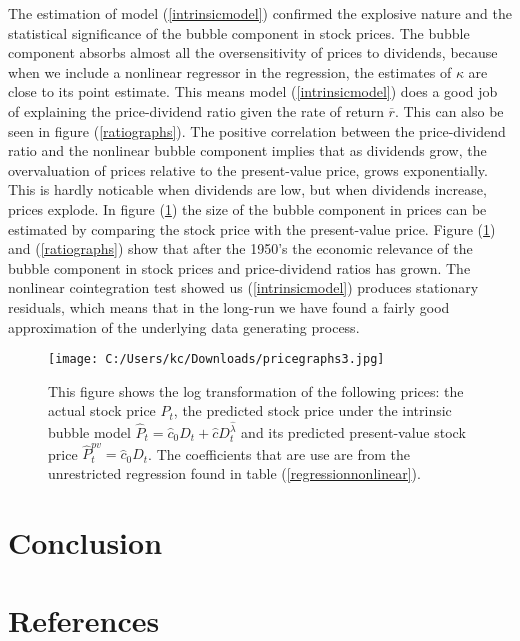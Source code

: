 \documentclass{article}
\begin{document}
The estimation of model (\ref{intrinsicmodel}) confirmed the explosive nature and the statistical significance of the bubble component in stock prices. The bubble component absorbs almost all the oversensitivity of prices to dividends, because when we include a nonlinear regressor in the regression, the estimates of $\kappa$ are close to its point estimate. This means model (\ref{intrinsicmodel}) does a good job of explaining the price-dividend ratio given the rate of return $\overline{r}$. This can also be seen in figure (\ref{ratiographs}). The positive correlation between the price-dividend ratio and the nonlinear bubble component implies that as dividends grow, the overvaluation of prices relative to the present-value price, grows exponentially. This is hardly noticable when dividends are low, but when dividends increase, prices explode. In figure (\ref{pricegraphs}) the size of the bubble component in prices can be estimated by comparing the stock price with the present-value price. Figure (\ref{pricegraphs}) and (\ref{ratiographs}) show that after the 1950's the economic relevance of the bubble component in stock prices and price-dividend ratios has grown. The nonlinear cointegration test showed us (\ref{intrinsicmodel}) produces stationary residuals, which means that in the long-run we have found a fairly good approximation of the underlying data generating process.





\begin{figure}[t!]
	\centering
		\texttt{[image: C:/Users/kc/Downloads/pricegraphs3.jpg]}
	\caption{This figure shows the log transformation of the following prices: the actual stock price $P_t$, the predicted stock price under the intrinsic bubble model $\widehat{P}_t = \widehat{c}_0D_t + \widehat{c}D_t^{\widehat{\lambda}}$ and its predicted present-value stock price $\widehat{P}_t^{pv} = \widehat{c}_0 D_t$.
	The coefficients that are use are from the unrestricted regression found in table (\ref{regressionnonlinear}).}
	\label{pricegraphs}
\end{figure}

\newpage


\section{Conclusion}
\section{References}
\end{document}
